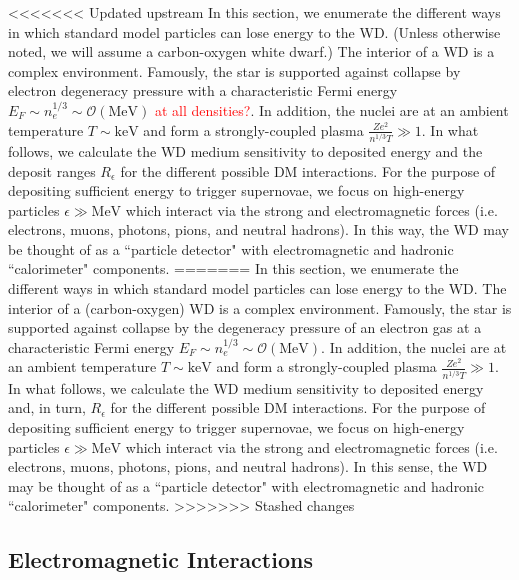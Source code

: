 \documentclass[11 pt,preprint,preprintnumbers,amsmath,amssymb, prd]{revtex4}
\newcommand{\OO}{\mathcal{O}}
\begin{document}
<<<<<<< Updated upstream
In this section, we enumerate the different ways in which standard model particles can lose energy to the WD. (Unless otherwise noted, we will assume a carbon-oxygen white dwarf.) The interior of a WD is a complex environment. Famously, the star is supported against collapse by electron degeneracy pressure with a characteristic Fermi energy $E_F \sim n_e^{1/3} \sim \OO(\text{MeV})$ \textcolor{red}{at all densities?}. In addition, the nuclei are at an ambient temperature $T \sim \text{keV}$ and form a strongly-coupled plasma $\frac{Z e^2}{n^{1/3} T} \gg 1$. In what follows, we calculate the WD medium sensitivity to deposited energy and the deposit ranges $R_\epsilon$ for the different possible DM interactions. For the purpose of depositing sufficient energy to trigger supernovae, we focus on high-energy particles $\epsilon \gg \text{MeV}$ which interact via the strong and electromagnetic forces (i.e. electrons, muons, photons, pions, and neutral hadrons). In this way, the WD may be thought of as a ``particle detector" with electromagnetic and hadronic ``calorimeter" components.
=======
In this section, we enumerate the different ways in which standard model particles can lose energy to the WD. The interior of a (carbon-oxygen) WD is a complex environment. Famously, the star is supported against collapse by the degeneracy pressure of an electron gas at a characteristic Fermi energy $E_F \sim n_e^{1/3} \sim \OO(\text{MeV})$. In addition, the nuclei are at an ambient temperature $T \sim \text{keV}$ and form a strongly-coupled plasma $\frac{Z e^2}{n^{1/3} T} \gg 1$. In what follows, we calculate the WD medium sensitivity to deposited energy and, in turn, $R_\epsilon$ for the different possible DM interactions. For the purpose of depositing sufficient energy to trigger supernovae, we focus on high-energy particles $\epsilon \gg \text{MeV}$ which interact via the strong and electromagnetic forces (i.e. electrons, muons, photons, pions, and neutral hadrons). In this sense, the WD may be thought of as a ``particle detector" with electromagnetic and hadronic ``calorimeter" components.  
>>>>>>> Stashed changes

\subsection{Electromagnetic Interactions}
\end{document}
